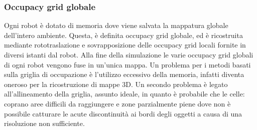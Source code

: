 \subsubsection{Occupacy grid globale}
\label{ssec:globaloccgrid}
Ogni robot è dotato di memoria dove viene salvata la mappatura globale
dell'intero ambiente. Questa, è definita occupacy grid globale, ed è ricostruita
mediante rototraslazione e sovrapposizione delle occupacy grid locali
fornite in diversi istanti dal robot.
Alla fine della simulazione le varie occupacy grid globali di ogni robot vengono
fuse in un'unica mappa.
Un problema per i metodi basati sulla griglia di occupazione è l'utilizzo
eccessivo della memoria, infatti diventa oneroso per la ricostruzione di mappe
3D.
Un secondo problema è legato all'allineamento della griglia, assunto ideale, in
quanto è probabile che le celle: coprano aree difficili da raggiungere e zone
parzialmente piene dove non è possibile catturare le acute discontinuità ai
bordi degli oggetti a causa di una risoluzione non sufficiente.
%